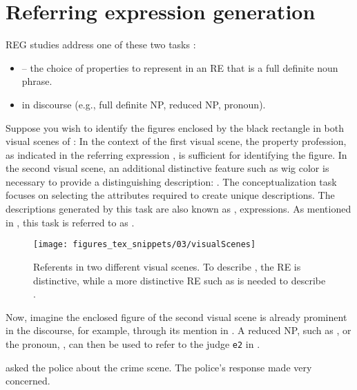 \section{Referring expression generation}\label{sec:introreg}
REG studies address one of these two tasks \citep{gatt2014models}:  

 \begin{itemize}
     \item {} -- the choice of properties to represent in an RE that is a full definite noun phrase.
     \item {} in discourse (e.g., full definite NP, reduced NP, pronoun).
 \end{itemize}

Suppose you wish to identify the figures enclosed by the black rectangle in both visual scenes of : In the context of the first visual scene, the property profession, as indicated in the referring expression , is sufficient for identifying the figure. In the second visual scene, an additional distinctive feature such as wig color is necessary to provide a distinguishing description: . The conceptualization task focuses on selecting the attributes required to create unique descriptions. The descriptions generated by this task are also known as ,  expressions. As mentioned in , this task is referred to as \shot.

\begin{figure}[htb]
	\centering
	\texttt{[image: figures\_tex\_snippets/03/visualScenes]}
	\caption[Referents in two different visual scenes.]{Referents in two different visual scenes. To describe , the RE  is distinctive, while a more distinctive RE such as  is needed to describe .}
	\label{fig:menwomen}
\end{figure}


 
Now, imagine the enclosed figure of the second visual scene is already prominent in the discourse, for example, through its mention in . A reduced NP, such as , or the pronoun, , can then be used to refer to the judge \texttt{e2} in .
\begin{exe}
	\ex \begin{xlist}
		\ex\label{fig:judge}  asked the police about the crime scene. 
		\ex\label{fig:judgereduced} The police's response made  very concerned.
	\end{xlist}
\end{exe}

